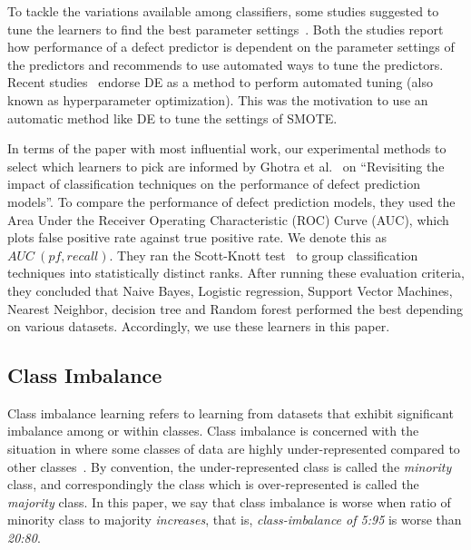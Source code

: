 \documentclass[sigconf,review, anonymous]{acmart}
\theoremstyle{break}
\theoremstyle{break}
\begin{document}
To tackle the variations available among classifiers, some studies suggested to tune the learners to find the best parameter settings~\cite{tantithamthavorn2016automated, fu2016tuning}.  Both the studies report how performance of a defect predictor is dependent on the parameter settings of the predictors and recommends to use automated ways to tune the predictors.
Recent studies~\cite{fu2016tuning, agrawal2016wrong} endorse DE as a method to perform automated tuning (also known as hyperparameter optimization). This was the motivation to use an automatic method like DE to
tune the settings of SMOTE.

In terms of the paper with most influential work,
our experimental methods to select which learners to pick are informed 
by  Ghotra et al.~\cite{ghotra2015revisiting} on ``Revisiting the impact of classification techniques on the performance of defect prediction models''. To 
compare  the  performance  of  defect prediction  models,  they  used  the  Area  Under  the Receiver Operating Characteristic (ROC) Curve (AUC), which plots  false  positive  rate  against   true  positive rate. We denote this as $AUC\ (pf, recall)$. 
They ran the Scott-Knott test~\cite{jelihovschi2014scottknott} to group classification techniques into statistically distinct ranks. After running these evaluation criteria, they concluded that Naive Bayes, Logistic regression, Support Vector Machines, Nearest Neighbor, decision tree and Random forest performed the best depending on various datasets. Accordingly, 
we use these learners in this paper.

\subsection{Class Imbalance }
\label{sect:motivation}

Class imbalance learning refers to learning from datasets that exhibit significant imbalance among or within classes. Class imbalance  is concerned with the situation in where some classes of data are
highly under-represented compared to other classes~\cite{he2009learning}. By convention,
the under-represented class is called the {\em minority} class,
and correspondingly the class which is over-represented is called the
{\em majority} class. In this paper, we say that class imbalance is worse when ratio of minority class to majority {\em increases}, that is,
{\em class-imbalance of 5:95} is worse than {\em 20:80}.
\end{document}
